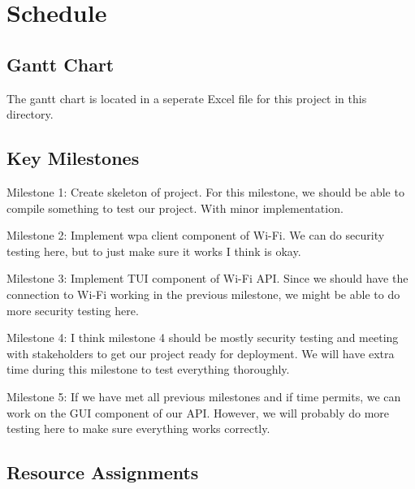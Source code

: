\section{Schedule}

\subsection{Gantt Chart}

The gantt chart is located in a seperate Excel file for this project in this directory.

\subsection{Key Milestones}

Milestone 1: Create skeleton of project. For this milestone, we should be able to compile something to test our project. With minor implementation. 

Milestone 2: Implement wpa client component of Wi-Fi. We can do security testing here, but to just make sure it works I think is okay. 

Milestone 3: Implement TUI component of Wi-Fi API. Since we should have the connection to Wi-Fi working in the previous milestone, we might be able 
to do more security testing here. 

Milestone 4: I think milestone 4 should be mostly security testing and meeting with stakeholders to get our project ready for deployment. We will have 
extra time during this milestone to test everything thoroughly. 

Milestone 5: If we have met all previous milestones and if time permits, we can work on the GUI component of our API. However, we will probably do more 
testing here to make sure everything works correctly. 

\subsection{Resource Assignments}
%

